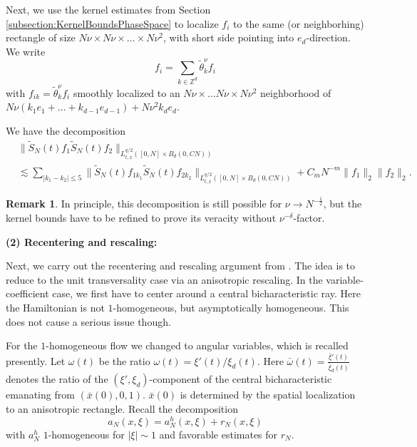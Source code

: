 \documentclass{amsart}
\numberwithin{equation}{section}
\theoremstyle{definition}
\newtheorem{remark}[theorem]{Remark}
\newcommand{\Z}{\mathbb{Z}}
\begin{document}
Next, we use the kernel estimates from Section \ref{subsection:KernelBoundsPhaseSpace} to localize  $f_i$ to the same (or neighborhing) rectangle of size $N \nu \times N \nu \times \ldots \times N \nu^2$, with short side pointing into $e_d$-direction. We write
\begin{equation*}
    f_i = \sum_{k \in \Z^d} \tilde{\theta}_k^{\nu} f_i
\end{equation*}
with $f_{i k} = \tilde{\theta}_k^{\nu} f_i$ smoothly localized to an $N \nu \times \ldots N \nu \times N \nu^2$ neighborhood of $N \nu (k_1 e_1 + \ldots + k_{d-1} e_{d-1}) + N \nu^2 k_d e_d$.

We have the decomposition
\begin{align*}
&\big\| \tilde{S}_N(t) f_1 \tilde{S}_N(t) f_2 \big\|_{L^{q/2}_{t,x}([0,N] \times B_d(0,CN))} \\
&\lesssim \sum_{|k_1 - k_2| \leq 5} \big\| \tilde{S}_N(t) f_{1 k_1} \tilde{S}_N(t) f_{2 k_2} \big\|_{L^{q/2}_{t,x}([0,N] \times B_d(0,CN))} + C_m N^{-m} \| f_1 \|_2 \| f_2 \|_2.
\end{align*}
\begin{remark}
In principle, this decomposition is still possible for $\nu \to N^{-\frac{1}{2}}$, but the kernel bounds have to be refined to prove its veracity without $\nu^{-\delta}$-factor.
\end{remark}

\textbf{(2) Recentering and rescaling:}

Next, we carry out the recentering and rescaling argument from \cite[Section~5.3]{SchippaTataru2025}. The idea is to reduce to the unit transversality case via an anisotropic rescaling. In the variable-coefficient case, we first have to center around a central bicharacteristic ray. Here the Hamiltonian is not $1$-homogeneous, but asymptotically homogeneous. This does not cause a serious issue though.

For the $1$-homogeneous flow we changed to angular variables, which is recalled presently. Let $\omega(t)$ be the ratio $\omega(t) = \xi'(t) / \xi_d(t)$. Here $\bar{\omega}(t) = \frac{\bar{\xi}'(t)}{\bar{\xi}_d(t)}$ denotes the ratio of the $(\xi',\xi_d)$-component of the central bicharacteristic emanating from $(\bar{x}(0),0,1)$. $\bar{x}(0)$ is determined by the spatial localization to an anisotropic rectangle.
Recall the decomposition
\begin{equation*}
a_N(x,\xi) = a_N^h(x,\xi) + r_N(x,\xi)
\end{equation*}
with $a_N^h$ $1$-homogeneous for $|\xi| \sim 1$ and favorable estimates for $r_N$.
\end{document}
